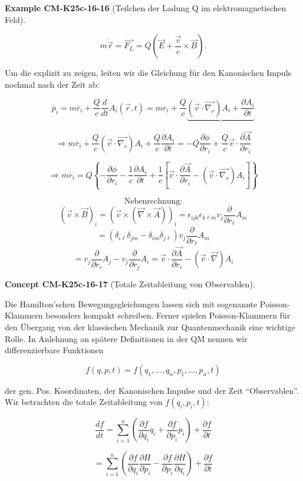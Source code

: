 \documentclass[10pt, letterpaper]{article}
\newcommand{\CustomHeading}[3]{%
  \par\medskip\noindent%
  \textbf{#1 #2} \textnormal{(#3)}.\enskip%
}
\newenvironment{EXA}[2]{\CustomHeading{Example}{#1}{#2}}{}
\newenvironment{CONC}[2]{\CustomHeading{Concept}{#1}{#2}}{}
\begin{document}
\begin{EXA}{CM-K25c-16-16}{Teilchen der Ladung Q im elektromagnetischen Feld}
\[m\ddot{\vec{r}} = \vec{F_L} = Q\left(\vec{E} + \frac{\vec{v}}{c}\times\vec{B}\right).\]

Um die explizit zu zeigen, leiten wir die Gleichung für den Kanonischen Impuls nochmal nach der Zeit ab:

\[\dot{p_i} = m\ddot{r_i} + \frac{Q}{c}\frac{d}{dt}A_i(\vec{r},t) = m\ddot{r_i} + \frac{Q}{c}\underbrace{(\vec{v}\cdot\vec{\nabla_r})A_i + \frac{\partial A_i}{\partial t}}\]

\[\Rightarrow m\ddot{r_i} + \frac{Q}{c}(\vec{v}\cdot\vec{\nabla_r})A_i + \frac{Q}{c}\frac{\partial A_i}{\partial t} = -Q\frac{\partial \phi}{\partial r_i} + \frac{Q}{c}\vec{v}\cdot\frac{\partial \vec{A}}{\partial r_i}\]

\[\Rightarrow m\ddot{r_i} = Q\left\{-\frac{\partial \phi}{\partial r_i} - \frac{1}{c}\frac{\partial A_i}{\partial t} + \frac{1}{c}\left[\vec{v}\cdot\frac{\partial \vec{A}}{\partial r_i} - (\vec{v}\cdot\vec{\nabla_r})A_i\right]\right\}\]

\[\text{Nebenrechnung:}\]
\[(\vec{v}\times\vec{B})_i = (\vec{v}\times(\vec{\nabla}\times\vec{A}))_i = \epsilon_{ijk}\epsilon_{k\ell m}v_j\frac{\partial}{\partial r_\ell}A_m\]
\[= (\delta_{i\ell}\delta_{jm} - \delta_{im}\delta_{j\ell})v_j\frac{\partial}{\partial r_\ell}A_m\]
\[= v_j\frac{\partial}{\partial r_i}A_j - v_j\frac{\partial}{\partial r_j}A_i = \vec{v}\cdot\frac{\partial \vec{A}}{\partial r_i} - (\vec{v}\cdot\vec{\nabla})A_i\]
\end{EXA}

\begin{CONC}{CM-K25c-16-17}{Totale Zeitableitung von Observablen}
Die Hamilton'schen Bewegungsgleichungen lassen sich mit sogenannte Poisson-Klammern besonders kompakt schreiben. Ferner spielen Poisson-Klammern für den Übergang von der klassischen Mechanik zur Quantenmechanik eine wichtige Rolle. In Anlehnung an spätere Definitionen in der QM nennen wir differenzierbare Funktionen

\[f(q,p,t) = f(q_1,...,q_n,p_1,...,p_n,t)\]

der gen. Pos. Koordinaten, der Kanonischen Impulse und der Zeit ``Observablen''. Wir betrachten die totale Zeitableitung von $f(q_i,p_i,t)$:

\[\frac{df}{dt} = \sum_{i=1}^n \left(\frac{\partial f}{\partial q_i}\dot{q_i} + \frac{\partial f}{\partial p_i}\dot{p_i}\right) + \frac{\partial f}{\partial t}\]

\[= \sum_{i=1}^n \left(\frac{\partial f}{\partial q_i}\frac{\partial H}{\partial p_i} - \frac{\partial f}{\partial p_i}\frac{\partial H}{\partial q_i}\right) + \frac{\partial f}{\partial t}\]
\end{CONC}
\end{document}
